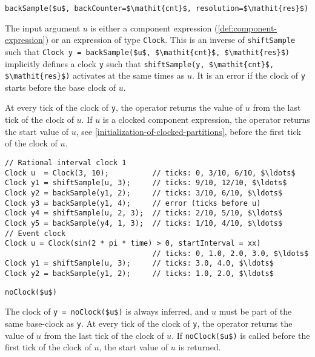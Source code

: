 \begin{operatordefinition}[backSample]
\begin{synopsis}\begin{lstlisting}
backSample($u$, backCounter=$\mathit{cnt}$, resolution=$\mathit{res}$)
\end{lstlisting}\end{synopsis}
\begin{semantics}
The input argument $u$ is either a component expression (\cref{def:component-expression}) or an expression of type \lstinline!Clock!.
This is an inverse of \lstinline!shiftSample! such that \lstinline!Clock y = backSample($u$, $\mathit{cnt}$, $\mathit{res}$)! implicitly defines a clock \lstinline!y! such that \lstinline!shiftSample(y, $\mathit{cnt}$, $\mathit{res}$)! activates at the same times as $u$.
It is an error if the clock of \lstinline!y! starts before the base clock of $u$.

At every tick of the clock of \lstinline!y!, the operator returns the value of $u$ from the last tick of the clock of $u$.
If $u$ is a clocked component expression, the operator returns the start value of $u$, see \cref{initialization-of-clocked-partitions}, before the first tick of the clock of $u$.

\begin{example}
\begin{lstlisting}[language=modelica]
// Rational interval clock 1
Clock u  = Clock(3, 10);          // ticks: 0, 3/10, 6/10, $\ldots$
Clock y1 = shiftSample(u, 3);     // ticks: 9/10, 12/10, $\ldots$
Clock y2 = backSample(y1, 2);     // ticks: 3/10, 6/10, $\ldots$
Clock y3 = backSample(y1, 4);     // error (ticks before u)
Clock y4 = shiftSample(u, 2, 3);  // ticks: 2/10, 5/10, $\ldots$
Clock y5 = backSample(y4, 1, 3);  // ticks: 1/10, 4/10, $\ldots$
// Event clock
Clock u = Clock(sin(2 * pi * time) > 0, startInterval = xx)
                                  // ticks: 0, 1.0, 2.0, 3.0, $\ldots$
Clock y1 = shiftSample(u, 3);     // ticks: 3.0, 4.0, $\ldots$
Clock y2 = backSample(y1, 2);     // ticks: 1.0, 2.0, $\ldots$
\end{lstlisting}
\end{example}
\end{semantics}
\end{operatordefinition}

\begin{operatordefinition}[noClock]
\begin{synopsis}\begin{lstlisting}
noClock($u$)
\end{lstlisting}\end{synopsis}
\begin{semantics}
The clock of \lstinline!y = noClock($u$)! is always inferred, and $u$ must be part of the same base-clock as \lstinline!y!.  At every tick of the clock of \lstinline!y!, the operator returns the value of $u$ from the last tick of the clock of $u$.  If \lstinline!noClock($u$)! is called before the first tick of the clock of $u$, the start value of $u$ is returned.
\end{semantics}
\end{operatordefinition}

